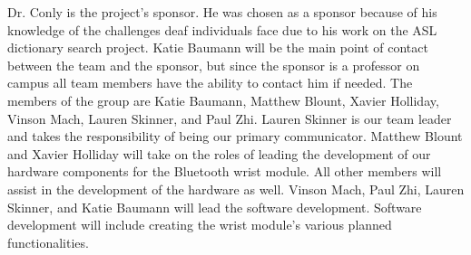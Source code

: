 Dr. Conly is the project's sponsor. He was chosen as a sponsor because of his knowledge of the challenges deaf individuals face due to his work on the ASL dictionary search project. Katie Baumann will be the main point of contact between the team and the sponsor, but since the sponsor is a professor on campus all team members have the ability to contact him if needed. The members of the group are Katie Baumann, Matthew Blount, Xavier Holliday, Vinson Mach, Lauren Skinner, and Paul Zhi. Lauren Skinner is our team leader and takes the responsibility of being our primary communicator. Matthew Blount and Xavier Holliday will take on the roles of leading the development of our hardware components for the Bluetooth wrist module. All other members will assist in the development of the hardware as well. Vinson Mach, Paul Zhi, Lauren Skinner, and Katie Baumann will lead the software development. Software development will include creating the wrist module's various planned functionalities.